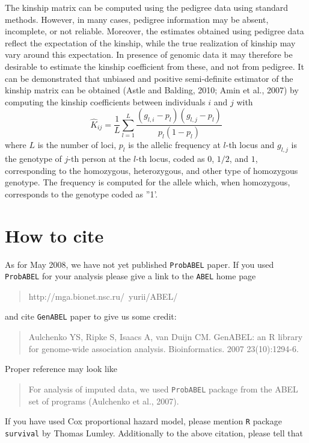 \documentclass[12pt]{article}
\begin{document}
The kinship matrix can be computed using the pedigree data using standard methods.
However, in many cases, pedigree information may be absent, incomplete, or not 
reliable. Moreover, the estimates obtained using pedigree data reflect the 
expectation of the kinship, while the true realization of kinship may vary 
around this expectation. In presence of genomic data it may therefore be 
desirable to estimate the kinship coefficient from these, and not from pedigree. 
It can be demonstrated that unbiased and positive semi-definite estimator 
of the kinship matrix can be obtained (Astle and Balding, 2010; Amin et al., 2007)
by computing the kinship coefficients between individuals $i$ and $j$ with
$$
\hat{K}_{ij} = \frac{1}{L} \sum_{l=1}^L \frac{ (g_{l,i} - p_l) (g_{l,j} - p_l) }{ p_l (1-p_l) }
$$
where $L$ is the number of loci, $p_l$ is the allelic frequency at $l$-th locus
and $g_{l,j}$ is the genotype of $j$-th person at the $l$-th locus, coded 
as $0$, $1/2$, and $1$, corresponding to the homozygous, heterozygous, and 
other type of homozygous genotype. The frequency is computed for the allele 
which, when homozygous, corresponds to the genotype coded as ''1'.


\section{How to cite}

As for May 2008, we have not yet published 
\texttt{ProbABEL} paper. If you used \texttt{ProbABEL} for 
your analysis please give a link to the \texttt{ABEL} home 
page 

\begin{quote}
http://mga.bionet.nsc.ru/~yurii/ABEL/
\end{quote}

and cite \texttt{GenABEL} paper to give us some credit: 

\begin{quote}
Aulchenko YS, Ripke S, Isaacs A, van Duijn CM.
GenABEL: an R library for genome-wide association analysis.
Bioinformatics. 2007 23(10):1294-6. 
\end{quote}

Proper reference may look like 

\begin{quote}
For analysis of imputed data, we used \texttt{ProbABEL} package 
from the ABEL 
set of programs (Aulchenko et al., 2007). 
\end{quote}

If you have used Cox proportional hazard model, please mention 
\texttt{R} package \texttt{survival} by Thomas Lumley. Additionally 
to the above citation, please tell that 
\end{document}
